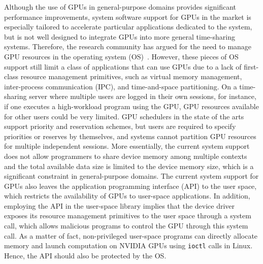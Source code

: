 Although the use of GPUs in general-purpose domains provides significant
performance improvements, system software support for GPUs in the market
is especially  tailored to accelerate particular applications dedicated
to the system, but is not well designed to integrate GPUs into more
general time-sharing systems.
Therefore, the research community has argued for the need to manage GPU
resources in the operating system (OS)~\cite{Bautin_MCNC08, Kato_ATC11,
Rossbach_SOSP11}.
However, these pieces of OS support still limit a class of applications
that can use GPUs due to a lack of first-class resource management
primitives, such as virtual memory management, inter-process
communication (IPC), and time-and-space partitioning.
On a time-sharing server where multiple users are logged in their own
sessions, for instance, if one executes a high-workload program using
the GPU, GPU 
resources available for other users could be very limited.
GPU schedulers in the state of the arts~\cite{Kato_ATC11,
Rossbach_SOSP11} support priority and reservation schemes, but users
are required to specify priorities or reserves by themselves, and
systems cannot partition GPU resources for multiple independent
sessions.
More essentially, the current system support does not allow
programmers to share device memory among multiple contexts and the total
available data size is limited to the device memory size, which is a
significant constraint in general-purpose domains.
The current system support for GPUs also leaves the application programming interface
(API) to the user space, which restricts the availability of GPUs to
user-space applications.
In addition, employing the API in the user-space library implies that
the device driver exposes its resource management primitives to the user
space through a system call, which allows malicious programs to control
the GPU through this system call. 
As a matter of fact, non-privileged user-space programs can directly
allocate memory and launch computation on NVIDIA GPUs using
\texttt{ioctl} calls in Linux.
Hence, the API should also be protected by the OS.

